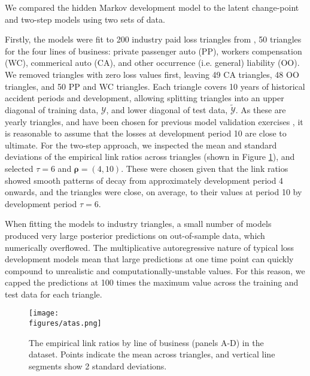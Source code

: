 We compared the hidden Markov development model to
the latent change-point and two-step models 
using two sets of data.

Firstly, the models were fit to 200 industry
paid loss triangles from \cite{meyers2015}, 50 triangles
for the four lines of business: private passenger auto (PP),
workers compensation (WC), commerical auto (CA), and
other occurrence (i.e. general) liability (OO).
We removed triangles with zero loss values first,
leaving 49 CA triangles, 48 OO triangles, and
50 PP and WC triangles.
Each triangle covers 10 years of historical
accident periods and development, allowing splitting
triangles into an upper diagonal of training data,
$\mathcal{Y}$, and lower diagonal of test data,
$\tilde{\mathcal{Y}}$.
As these are yearly triangles, and have been
chosen for previous model validation exercises \citep{meyers2015},
it is reasonable to assume that the losses at development
period 10 are close to ultimate.
For the two-step approach, we inspected the
mean and standard deviations of the empirical
link ratios across triangles (shown in Figure
\ref{fig:industry-atas}), and selected
$\tau = 6$ and $\bm{\rho} = (4, 10)$. These
were chosen given
that the link ratios showed smooth patterns
of decay from approximately development period
4 onwards, and the
triangles were close, on average, to their values
at period 10 by development period $\tau = 6$.

When fitting the models to industry triangles,
a small number of models
produced
very large posterior predictions on out-of-sample
data, which numerically overflowed. The multiplicative
autoregressive nature of typical loss development models
mean that large predictions at one
time point can quickly compound to unrealistic and
computationally-unstable values. For this reason,
we capped the predictions at 100 times the
maximum value across the training and test data
for each triangle.

\begin{figure}
    \centering
    \texttt{[image: \\figures/atas.png]}
    \caption{
        The empirical link ratios by line of business 
		(panels A-D) in
        the \cite{meyers2015} dataset.
        Points indicate the mean across triangles,
        and vertical line segments show 2 standard
        deviations.
    }
	\label{fig:industry-atas}
\end{figure}

